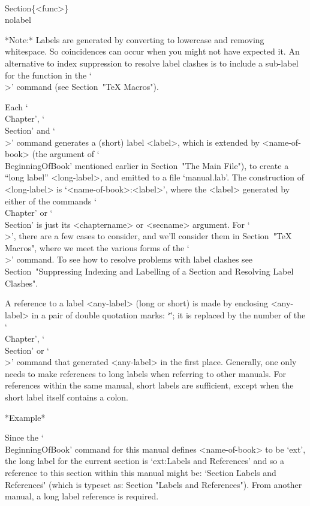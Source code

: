 \)\\Section\{<func>\}\\nolabel

*Note:* Labels are generated by  converting  to  lowercase  and  removing
whitespace. So coincidences can occur when you might  not  have  expected
it. An alternative to index suppression to resolve label  clashes  is  to
include  a  sub-label  for  the  function  in  the  `\\>'  command   (see
Section~"TeX Macros").


Each `\\Chapter', `\\Section' and `\\>' command generates a (short) label
<label>,  which  is  extended  by   <name-of-book>   (the   argument   of
`\\BeginningOfBook' mentioned earlier in  Section~"The  Main  File"),  to
create a ``long label'' <long-label>, and emitted to a file `manual.lab'.
The construction of <long-label> is `<name-of-book>:<label>',  where  the
<label> generated by either of the commands `\\Chapter' or `\\Section' is
just its <chaptername> or <secname> argument. For `\\>', there are a  few
cases to consider, and we'll consider them in Section~"TeX Macros", where
we meet the various forms of the `\\>' command. To  see  how  to  resolve
problems  with  label  clashes  see  Section~"Suppressing  Indexing   and
Labelling of a Section and Resolving Label Clashes".

A reference to a label <any-label> (long or short) is made  by  enclosing
<any-label> in a pair of double quotation marks: `\"<any-label>\"'; it is
replaced by the number of the `\\Chapter', `\\Section' or  `\\>'  command
that generated <any-label> in the first place. Generally, one only  needs
to make references to long labels when referring to  other  manuals.  For
references within the same manual, short labels  are  sufficient,  except
when the short label itself contains a colon.

*Example*

Since  the  `\\BeginningOfBook'   command   for   this   manual   defines
<name-of-book> to be `ext', the long label for  the  current  section  is
`ext:Labels and References' and so a reference  to  this  section  within
this manual might be:  `Section  \"Labels  and  References\"'  (which  is
typeset as: Section "Labels and References"). From another manual, a long
label reference is required.

